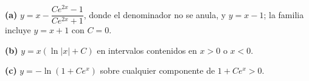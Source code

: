 \noindent\textbf{(a)} $y=x-\dfrac{Ce^{2x}-1}{Ce^{2x}+1}$, donde el denominador no se anula, y $y=x-1$; la familia incluye $y=x+1$ con $C=0$.

\noindent\textbf{(b)} $y=x(\ln|x|+C)$ en intervalos contenidos en $x>0$ o $x<0$.

\noindent\textbf{(c)} $y=-\ln(1+Ce^x)$ sobre cualquier componente de $1+Ce^x>0$.
